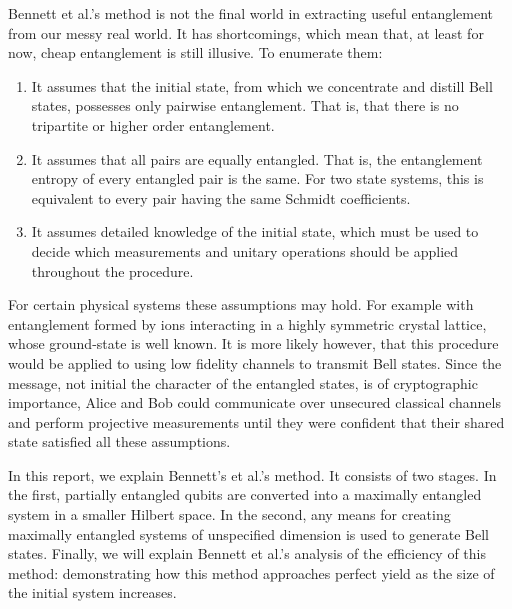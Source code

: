 Bennett et al.'s method is not the final world in extracting useful entanglement from our messy real world.
It has shortcomings, which mean that, at least for now, cheap entanglement is still illusive. To enumerate them:
\begin{enumerate}
	\item It assumes that the initial state, from which we concentrate and distill Bell states, possesses only pairwise entanglement. That is, that there is no tripartite or higher order entanglement.
	\item It assumes that all pairs are equally entangled. That is, the entanglement entropy of every entangled pair is the same. For two state systems, this is equivalent to every pair having the same Schmidt coefficients.
	\item It assumes detailed knowledge of the initial state, which must be used to decide which measurements and unitary operations should be applied throughout the procedure. 
\end{enumerate}

For certain physical systems these assumptions may hold. 
For example with entanglement formed by ions interacting in a highly symmetric crystal lattice, whose ground-state is well known.
It is more likely however, that this procedure would be applied to using low fidelity channels to transmit Bell states.
Since the message, not initial the character of the entangled states, is of cryptographic importance, Alice and Bob could communicate over unsecured classical channels and perform projective measurements until they were confident that their shared state satisfied all these assumptions.

In this report, we explain Bennett's et al.'s method.
It consists of two stages.
In the first, partially entangled qubits are converted into a maximally entangled system in a smaller Hilbert space.
In the second, any means for creating maximally entangled systems of unspecified dimension is used to generate Bell states.
Finally, we will explain Bennett et al.'s analysis of the efficiency of this method: demonstrating how this method approaches perfect yield as the size of the initial system increases.

